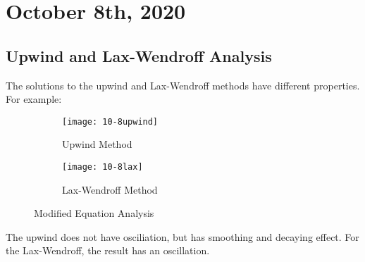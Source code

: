\documentclass[../main/main.tex]{subfiles}
\begin{document}
\section{October  8th, 2020}
\subsection{Upwind and Lax-Wendroff Analysis}
The solutions to the upwind and Lax-Wendroff methods have different properties. For example:
\begin{figure}[h!]
\centering
\begin{subfigure}{.5\textwidth}
  \centering
  \texttt{[image: 10-8upwind]}
  \caption{Upwind Method}
  \label{fig:sub1}
\end{subfigure}%
\begin{subfigure}{.5\textwidth}
  \centering
  \texttt{[image: 10-8lax]}
  \caption{Lax-Wendroff Method}
  \label{fig:sub2}
\end{subfigure}
\caption{Modified Equation Analysis}
\label{fig:test}
\end{figure}
\begin{remark}
    The upwind does not have osciliation, but has smoothing and decaying effect. For the Lax-Wendroff, the result has an oscillation.
\end{remark}
\end{document}
